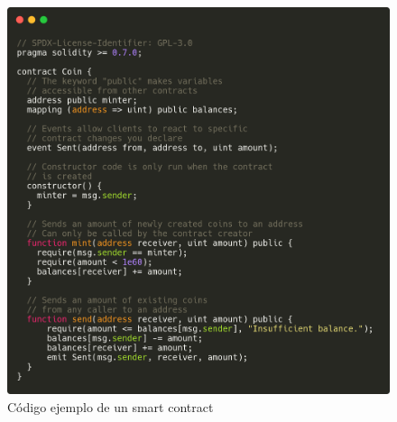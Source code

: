 % 
% 
% 
% 
% 

\begin{figure}[h!]
  \centering
  \includegraphics[width=0.7\linewidth]{figs/EstadoArte/Ethereum/SmartContract}
  \caption[Código ejemplo de un smart contract]{Código ejemplo de un smart contract}
  \label{fig:soliditySmartContractEntero}
\end{figure}



